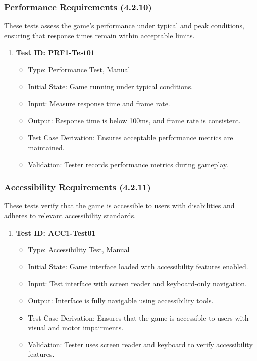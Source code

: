 \documentclass[12pt, titlepage]{article}
\begin{document}
\subsubsection{Performance Requirements (4.2.10)}

These tests assess the game’s performance under typical and peak conditions, ensuring that response times remain within acceptable limits.

\begin{enumerate}
    \item \textbf{Test ID: PRF1-Test01}
        \begin{itemize}
            \item Type: Performance Test, Manual
            \item Initial State: Game running under typical conditions.
            \item Input: Measure response time and frame rate.
            \item Output: Response time is below 100ms, and frame rate is consistent.
            \item Test Case Derivation: Ensures acceptable performance metrics are maintained.
            \item Validation: Tester records performance metrics during gameplay.
        \end{itemize}
\end{enumerate}

\subsubsection{Accessibility Requirements (4.2.11)}

These tests verify that the game is accessible to users with disabilities and adheres to relevant accessibility standards.

\begin{enumerate}
    \item \textbf{Test ID: ACC1-Test01}
        \begin{itemize}
            \item Type: Accessibility Test, Manual
            \item Initial State: Game interface loaded with accessibility features enabled.
            \item Input: Test interface with screen reader and keyboard-only navigation.
            \item Output: Interface is fully navigable using accessibility tools.
            \item Test Case Derivation: Ensures that the game is accessible to users with visual and motor impairments.
            \item Validation: Tester uses screen reader and keyboard to verify accessibility features.
        \end{itemize}
\end{enumerate}
\end{document}

